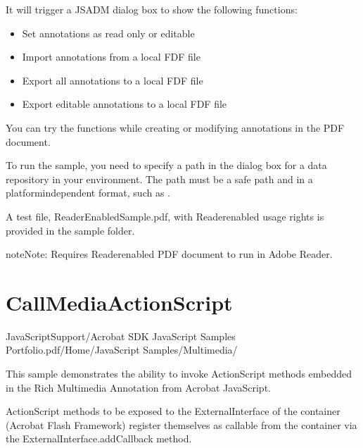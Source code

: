 \documentclass[letterpaper,12pt,english,openany,oneside]{sphinxmanual}
\begin{document}
It will trigger a JSADM dialog box to show the following functions:
\begin{itemize}
\item {} 
Set annotations as read only or editable

\item {} 
Import annotations from a local FDF file

\item {} 
Export all annotations to a local FDF file

\item {} 
Export editable annotations to a local FDF file

\end{itemize}

You can try the functions while creating or modifying annotations in the PDF document.

To run the sample, you need to specify a path in the dialog box for a data repository in your environment. The path must be a safe path and in a platform\sphinxhyphen{}independent format, such as  .

A test file, ReaderEnabledSample.pdf, with Reader\sphinxhyphen{}enabled usage rights is provided in the sample folder.

\begin{sphinxadmonition}{note}{Note:}
Requires Reader\sphinxhyphen{}enabled PDF document to run in Adobe Reader.
\end{sphinxadmonition}


\section{CallMediaActionScript}
\label{\detokenize{Samples_JavaScript:callmediaactionscript}}\label{\detokenize{Samples_JavaScript:location-5}}

JavaScriptSupport/Acrobat SDK JavaScript Samples Portfolio.pdf/Home/JavaScript Samples/Multimedia/

\label{\detokenize{Samples_JavaScript:description-5}}

This sample demonstrates the ability to invoke ActionScript methods embedded in the Rich Multimedia Annotation from Acrobat JavaScript.

ActionScript methods to be exposed to the ExternalInterface of the container (Acrobat Flash Framework) register themselves as callable from the container via the ExternalInterface.addCallback method.
\end{document}
